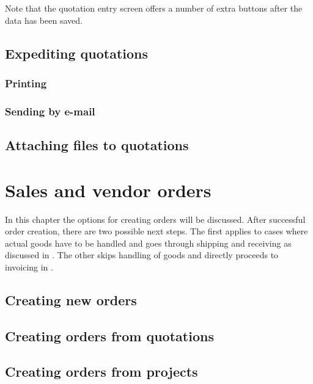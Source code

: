 Note that the quotation entry screen offers a number of extra buttons after the data has
been saved.

\section{Expediting quotations}
\label{sec-workflows-quotations-sending}

\subsection{Printing}
\label{subsec-workflow-quotiontions-sending-print}

\subsection{Sending by e-mail}
\label{subsec-workflow-quotations-sending-email}

\section{Attaching files to quotations}
\label{sec-workflows-quotations-file-attachments}


\chapter{Sales and vendor orders}
\label{cha-workflows-orders}

In this chapter the options for creating orders will be discussed.
After successful order creation, there are two possible next steps.
The first applies to cases where actual goods have to be handled
and goes through shipping and receiving as discussed in
. The other skips handling of goods
and directly proceeds to invoicing in .

\section{Creating new orders}
\label{sec-workflows-orders-creation}

\section{Creating orders from quotations}
\label{sec-workflows-orders-creation-from-quotations}

\section{Creating orders from projects}
\label{sec-workflows-orders-creation-from-projects}

